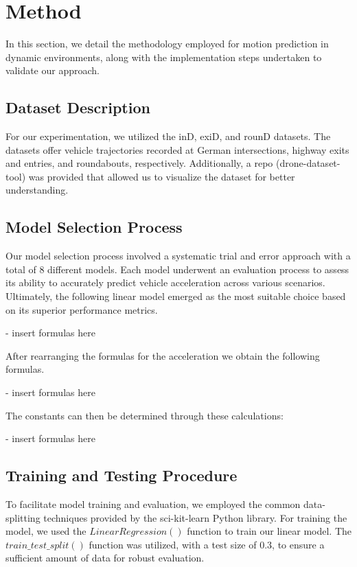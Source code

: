 \section{Method}

In this section, we detail the methodology employed for motion prediction in dynamic environments, 
along with the implementation steps undertaken to validate our approach.

\subsection{Dataset Description} 
For our experimentation, we utilized the inD, exiD, and rounD datasets.
The datasets offer vehicle trajectories recorded at German intersections, highway exits and entries, and roundabouts, respectively. 
Additionally, a repo (drone-dataset-tool) was provided that allowed us to visualize the dataset for better understanding. 


\subsection{Model Selection Process} 
Our model selection process involved a systematic trial and error approach with a total of 8 different models. 
Each model underwent an evaluation process to assess its ability to accurately predict vehicle acceleration across 
various scenarios. 
Ultimately, the following linear model emerged as the most suitable choice based on its superior performance metrics.

- insert formulas here

After rearranging the formulas for the acceleration we obtain the following formulas.

- insert formulas here

The constants can then be determined through these calculations:

- insert formulas here

\subsection{Training and Testing Procedure} 
To facilitate model training and evaluation, we employed the common data-splitting techniques provided by 
the sci-kit-learn Python library. 
For training the model, we used the $LinearRegression()$ function to train our linear model.
The $train\_test\_split()$ function was utilized, with a test size of 0.3, to ensure a sufficient amount of data 
for robust evaluation.

